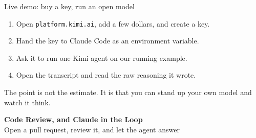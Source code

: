 \documentclass[aspectratio=169,11pt]{beamer}
\begin{document}
\begin{frame}{Live demo: buy a key, run an open model}
\begin{enumerate}\setlength\itemsep{0.3em}
    \item Open \texttt{platform.kimi.ai}, add a few dollars, and create a key.
    \item Hand the key to Claude Code as an environment variable.
    \item Ask it to run one Kimi agent on our running example.
    \item Open the transcript and read the raw reasoning it wrote.
\end{enumerate}
\vspace{0.4cm}
\alert{The point is not the estimate. It is that you can stand up your own model and watch it think.}
\end{frame}




\begin{frame}[plain]
\vfill
\begin{center}
{\LARGE\bfseries\textcolor{charcoal}{Code Review, and Claude in the Loop}}\\[0.35cm]
{\large\textcolor{warmgray}{Open a pull request, review it, and let the agent answer}}
\end{center}
\vfill
\end{frame}
\end{document}
